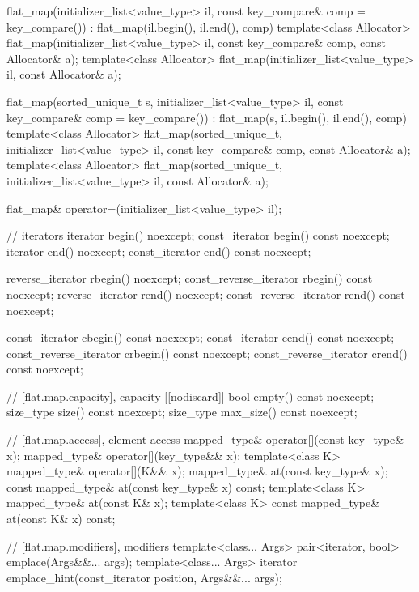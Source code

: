 \begin{codeblock}
{{    flat_map(initializer_list<value_type> il, const key_compare& comp = key_compare())
        : flat_map(il.begin(), il.end(), comp) { }
    template<class Allocator>
      flat_map(initializer_list<value_type> il, const key_compare& comp, const Allocator& a);
    template<class Allocator>
      flat_map(initializer_list<value_type> il, const Allocator& a);

    flat_map(sorted_unique_t s, initializer_list<value_type> il,
             const key_compare& comp = key_compare())
        : flat_map(s, il.begin(), il.end(), comp) { }
    template<class Allocator>
      flat_map(sorted_unique_t, initializer_list<value_type> il,
               const key_compare& comp, const Allocator& a);
    template<class Allocator>
      flat_map(sorted_unique_t, initializer_list<value_type> il, const Allocator& a);

    flat_map& operator=(initializer_list<value_type> il);

    // iterators
    iterator               begin() noexcept;
    const_iterator         begin() const noexcept;
    iterator               end() noexcept;
    const_iterator         end() const noexcept;

    reverse_iterator       rbegin() noexcept;
    const_reverse_iterator rbegin() const noexcept;
    reverse_iterator       rend() noexcept;
    const_reverse_iterator rend() const noexcept;

    const_iterator         cbegin() const noexcept;
    const_iterator         cend() const noexcept;
    const_reverse_iterator crbegin() const noexcept;
    const_reverse_iterator crend() const noexcept;

    // \ref{flat.map.capacity}, capacity
    [[nodiscard]] bool empty() const noexcept;
    size_type size() const noexcept;
    size_type max_size() const noexcept;

    // \ref{flat.map.access}, element access
    mapped_type& operator[](const key_type& x);
    mapped_type& operator[](key_type&& x);
    template<class K> mapped_type& operator[](K&& x);
    mapped_type& at(const key_type& x);
    const mapped_type& at(const key_type& x) const;
    template<class K> mapped_type& at(const K& x);
    template<class K> const mapped_type& at(const K& x) const;

    // \ref{flat.map.modifiers}, modifiers
    template<class... Args> pair<iterator, bool> emplace(Args&&... args);
    template<class... Args>
      iterator emplace_hint(const_iterator position, Args&&... args);

}}
\end{codeblock}
